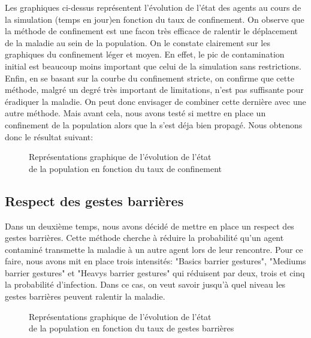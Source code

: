 \documentclass[a4paper, 12pt]{article}
\begin{document}
Les graphiques ci-dessus représentent l'évolution de l'état des agents au cours de la simulation (temps en jour)en fonction du taux de confinement.
On observe que la méthode de confinement est une facon très efficace de ralentir le déplacement de la maladie au sein de la population. On le constate clairement
sur les graphiques du confinement léger et moyen. En effet, le pic de contamination initial est beaucoup moins important que celui de la simulation sans restrictions.
Enfin, en se basant sur la courbe du confinement stricte, on confirme que cette méthode, malgré un degré très important de limitations, n'est pas suffisante pour éradiquer la maladie.
On peut donc envisager de combiner cette dernière avec une autre méthode. Mais avant cela, nous avons testé si mettre en place un confinement de la population alors que la s'est déja bien propagé.
Nous obtenons donc le résultat suivant:

\begin{figure}[!h]
	\centering
	\qquad
	\centering
	\qquad
	\caption{Représentations graphique de l'évolution de l'état\\ de la population en fonction du taux de confinement}

\end{figure}

\newpage

\subsection{Respect des gestes barrières}
Dans un deuxième temps, nous avons décidé de mettre en place un respect des gestes barrières. Cette méthode cherche à réduire la probabilité qu'un agent contaminé transmette la maladie à un autre agent
lors de leur rencontre. Pour ce faire, nous avons mit en place trois intensités: "Basics barrier gestures", "Mediums barrier gestures" et "Heavys barrier gestures" qui réduisent par deux, trois et cinq
la probabilité d'infection. Dans ce cas, on veut savoir jusqu'à quel niveau les gestes barrières peuvent ralentir la maladie.

\begin{figure}[!h]
	\centering
	\qquad
	\centering
	\qquad
	\caption{Représentations graphique de l'évolution de l'état\\ de la population en fonction du taux de gestes barrières}

\end{figure}
\end{document}
